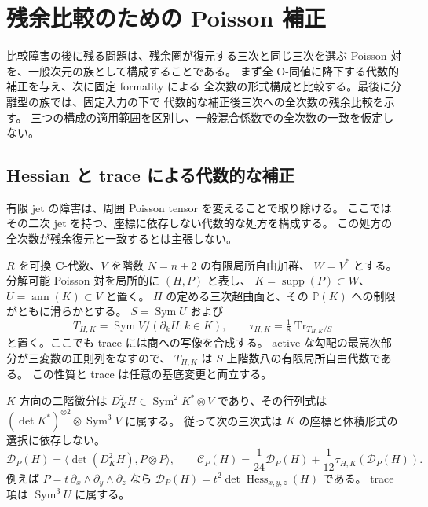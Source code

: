 \section{残余比較のための Poisson 補正}
\label{sec:nfm-poisson-correction}

比較障害の後に残る問題は、残余圏が復元する三次と同じ三次を選ぶ
Poisson 対を、一般次元の族として構成することである。
まず全 O-同値に降下する代数的補正を与え、次に固定 formality による
全次数の形式構成と比較する。最後に分離型の族では、固定入力の下で
代数的な補正後三次への全次数の残余比較を示す。
三つの構成の適用範囲を区別し、一般混合係数での全次数の一致を仮定しない。

\subsection{Hessian と trace による代数的な補正}
\label{sec:nfm-algebraic-correction}

有限 jet の障害は、周囲 Poisson tensor を変えることで取り除ける。
ここではその二次 jet を持つ、座標に依存しない代数的な処方を構成する。
この処方の全次数が残余復元と一致するとは主張しない。

$R$ を可換 $\mathbf C$-代数、$V$ を階数 $N=n+2$ の有限局所自由加群、
$W=V^*$ とする。分解可能 Poisson 対を局所的に $(H,P)$ と表し、
$K=\operatorname{supp}(P)\subset W$、$U=\operatorname{ann}(K)\subset V$ と置く。
$H$ の定める三次超曲面と、その $\mathbb P(K)$ への制限がともに滑らかとする。
$S=\operatorname{Sym}U$ および
\[
 T_{H,K}=\operatorname{Sym}V/(\partial_kH:k\in K),\qquad
 \tau_{H,K}=\tfrac18\operatorname{Tr}_{T_{H,K}/S}
\]
と置く。ここでも trace には商への写像を合成する。
active な勾配の最高次部分が三変数の正則列をなすので、
$T_{H,K}$ は $S$ 上階数八の有限局所自由代数である。
この性質と trace は任意の基底変更と両立する。

$K$ 方向の二階微分は
$D_K^2H\in\operatorname{Sym}^2K^*\otimes V$ であり、その行列式は
$(\det K^*)^{\otimes2}\otimes\operatorname{Sym}^3V$ に属する。
従って次の三次式は $K$ の座標と体積形式の選択に依存しない。
\begin{equation}\label{eq:nfm-intrinsic-hessian-correction}
 \mathcal D_P(H)=\langle\det(D_K^2H),P\otimes P\rangle,
 \qquad
 \mathcal C_P(H)=\frac1{24}\mathcal D_P(H)
       +\frac1{12}\tau_{H,K}(\mathcal D_P(H)).
\end{equation}
例えば $P=t\,\partial_x\wedge\partial_y\wedge\partial_z$ なら
$\mathcal D_P(H)=t^2\det\operatorname{Hess}_{x,y,z}(H)$ である。
trace 項は $\operatorname{Sym}^3U$ に属する。


